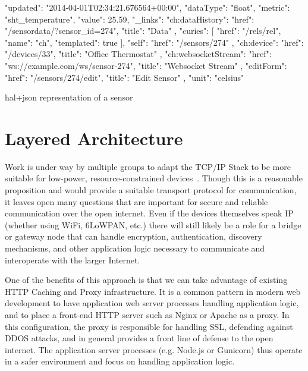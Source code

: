 \documentclass{acm_proc_article-sp}
\begin{document}
\begin{listing}
\begin{jsoncode}
  {
    "updated": "2014-04-01T02:34:21.676564+00:00",
    "dataType": "float",
    "metric": "sht_temperature",
    "value": 25.59,
    "_links": {
      "ch:dataHistory": {
        "href": "/sensordata/?sensor_id=274",
        "title": "Data"
      },
      "curies": [
        {
          "href": "/rels/{rel}",
          "name": "ch",
          "templated": true
        }
      ],
      "self": {
        "href": "/sensors/274"
      },
      "ch:device": {
        "href": "/devices/33",
        "title": "Office Thermostat"
      },
      "ch:websocketStream": {
        "href": "ws://example.com/ws/sensor-274",
        "title": "Websocket Stream"
      },
      "editForm": {
        "href": "/sensors/274/edit",
        "title": "Edit Sensor"
      }
    },
    "unit": "celsius"
  }
\end{jsoncode}
\caption{hal+json representation of a sensor}
\label{sensorjson}
\end{listing}


\section{Layered Architecture}

Work is under way by multiple groups to adapt the TCP/IP Stack to be more
suitable for low-power, resource-constrained devices~\cite{iotsurvey}.  Though
this is a reasonable proposition and would provide a suitable transport
protocol for communication, it leaves open many questions that are important
for secure and reliable communication over the open internet. Even if the
devices themselves speak IP (whether using WiFi, 6LoWPAN, etc.) there will
still likely be a role for a bridge or gateway node that can handle encryption,
authentication, discovery mechanisms, and other application logic necessary to
communicate and interoperate with the larger Internet.

One of the benefits of this approach is that we can take advantage of existing
HTTP Caching and Proxy infrastructure. It is a common pattern in modern web
development to have application web server processes handling application
logic, and to place a front-end HTTP server such as Nginx or Apache as a proxy.
In this configuration, the proxy is responsible for handling SSL, defending
against DDOS attacks, and in general provides a front line of defense to the
open internet. The application server processes (e.g. Node.js or Gunicorn) thus
operate in a safer environment and focus on handling application logic.
\end{document}
